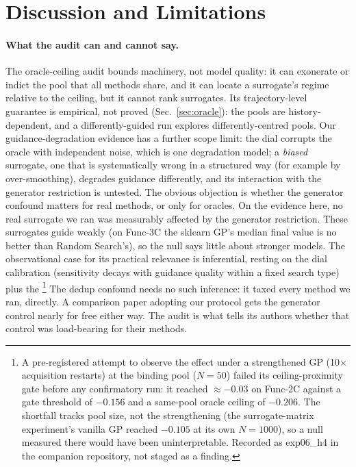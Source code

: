 \documentclass[%
 aip,
 amsmath,amssymb,
 floatfix,
 reprint,%
]{revtex4-1}
\begin{document}
\section{Discussion and Limitations}

\paragraph{What the audit can and cannot say.}
The oracle-ceiling audit bounds machinery, not model quality: it can
exonerate or indict the pool that all methods share, and it can locate a
surrogate's regime relative to the ceiling, but it cannot rank
surrogates. Its trajectory-level guarantee is empirical, not proved
(Sec.~\ref{sec:oracle}): the pools are history-dependent, and a
differently-guided run explores differently-centred pools. Our
guidance-degradation evidence has a further scope limit: the dial
corrupts the oracle with independent noise, which is one degradation
model; a \emph{biased} surrogate, one that is systematically wrong in
a structured way (for example by over-smoothing), degrades guidance
differently, and its interaction with the generator restriction is
untested. The obvious objection is whether the generator confound
matters for real methods, or only for oracles. On
the evidence here, no real surrogate we ran was measurably affected by
the generator restriction. These surrogates guide weakly (on Func-3C the
sklearn GP's median final value is no better than Random Search's), so the
null says little about stronger models. The observational case for its practical
relevance is inferential, resting on the dial calibration (sensitivity
decays with guidance quality within a fixed search type) plus the
\footnote{A pre-registered attempt to observe the effect under a
strengthened GP (10$\times$ acquisition restarts) at the binding pool
($N{=}50$) failed its ceiling-proximity gate before any confirmatory
run: it reached $\approx -0.03$ on Func-2C against a gate threshold of
$-0.156$ and a same-pool oracle ceiling of $-0.206$. The shortfall tracks
pool size, not the strengthening (the surrogate-matrix experiment's
vanilla GP reached $-0.105$ at its own $N{=}1000$), so a null measured
there would have been
uninterpretable. Recorded as exp06\_h4 in the companion repository, not
staged as a finding.}
The dedup
confound needs no such inference: it taxed every method we ran,
directly. A comparison paper adopting our protocol gets the generator
control nearly for free either way. The audit is what tells its authors
whether that control was load-bearing for their methods.
\end{document}
